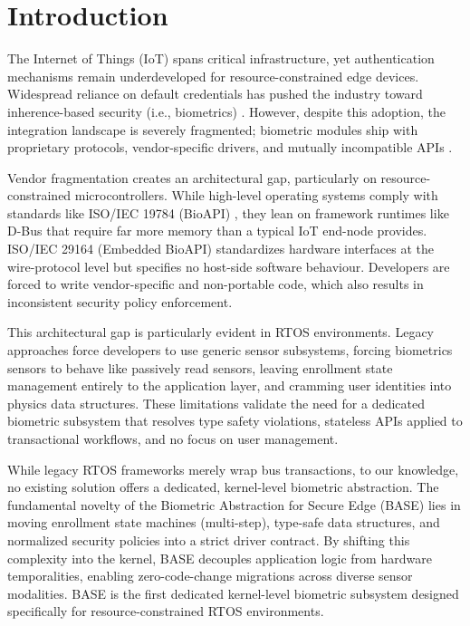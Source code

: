 \section{Introduction}
\label{sec:introduction}

The Internet of Things (IoT) spans critical infrastructure, yet authentication mechanisms remain underdeveloped \cite{iotreview, ahvanooey2022modern} for resource-constrained edge devices. Widespread reliance on default credentials \cite{ibm2025} has pushed the industry toward inherence-based security (i.e., biometrics) \cite{markets2025}. However, despite this adoption, the integration landscape is severely fragmented; biometric modules ship with proprietary protocols, vendor-specific drivers, and mutually incompatible APIs \cite{yang2021biometric}.

Vendor fragmentation creates an architectural gap, particularly on resource-constrained microcontrollers. While high-level operating systems comply with standards like ISO/IEC 19784 (BioAPI) \cite{iso19784}, they lean on framework runtimes like D-Bus that require far more memory than a typical IoT end-node provides. ISO/IEC 29164 (Embedded BioAPI) \cite{iso29164} standardizes hardware interfaces at the wire-protocol level but specifies no host-side software behaviour. Developers are forced to write vendor-specific and non-portable code, which also results in inconsistent security policy enforcement.

This architectural gap is particularly evident in RTOS environments. Legacy approaches force developers to use generic sensor subsystems, forcing biometrics sensors to behave like passively read sensors, leaving enrollment state management entirely to the application layer, and cramming user identities into physics data structures. These limitations validate the need for a dedicated biometric subsystem that resolves type safety violations, stateless APIs applied to transactional workflows, and no focus on user management.

While legacy RTOS frameworks merely wrap bus transactions, to our knowledge, no existing solution offers a dedicated, kernel-level biometric abstraction. The fundamental novelty of the Biometric Abstraction for Secure Edge (BASE) lies in moving enrollment state machines (multi-step), type-safe data structures, and normalized security policies into a strict driver contract. By shifting this complexity into the kernel, BASE decouples application logic from hardware temporalities, enabling zero-code-change migrations across diverse sensor modalities. BASE is the first dedicated kernel-level biometric subsystem designed specifically for resource-constrained RTOS environments.

